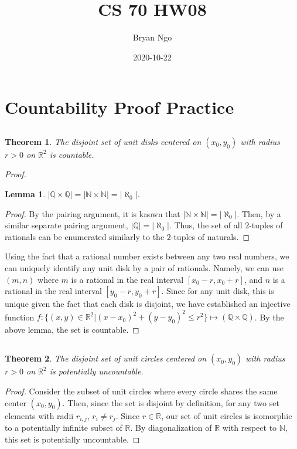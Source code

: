 \documentclass{article}
\title{CS 70 HW08}
\author{Bryan Ngo}
\date{2020-10-22}
\newtheorem{theorem}{Theorem}
\newtheorem{lemma}{Lemma}
\newcommand{\N}{\mathbb{N}}
\newcommand{\Q}{\mathbb{Q}}
\newcommand{\R}{\mathbb{R}}
\begin{document}
\maketitle

\section{Countability Proof Practice}

\subsection{}

\begin{theorem}
    The disjoint set of unit disks centered on \((x_0, y_0)\) with radius \(r > 0\) on \(\R^2\) is countable.
\end{theorem}
\begin{proof}
    \begin{lemma}
        \(|\Q \times \Q| = |\N \times \N| = |\aleph_0|\).
    \end{lemma}
    \begin{proof}
        By the pairing argument, it is known that \(|\N \times \N| = |\aleph_0|\).
        Then, by a similar separate pairing argument, \(|\Q| = |\aleph_0|\).
        Thus, the set of all \(2\)-tuples of rationals can be enumerated similarly to the \(2\)-tuples of naturals.
    \end{proof}
    Using the fact that a rational number exists between any two real numbers, we can uniquely identify any unit disk by a pair of rationals.
    Namely, we can use \((m, n)\) where \(m\) is a rational in the real interval \([x_0 - r, x_0 + r]\), and \(n\) is a rational in the real interval \([y_0 - r, y_0 + r]\).
    Since for any unit disk, this is unique given the fact that each disk is disjoint, we have established an injective function \(f: \{(x, y) \in \R^2 | (x - x_0)^2 + (y - y_0)^2 \leqslant r^2\} \mapsto (\Q \times \Q)\).
    By the above lemma, the set is countable.
\end{proof}

\subsection{}

\begin{theorem}
    The disjoint set of unit circles centered on \((x_0, y_0)\) with radius \(r > 0\) on \(\R^2\) is potentially uncountable.
\end{theorem}
\begin{proof}
    Consider the subset of unit circles where every circle shares the same center \((x_0, y_0)\).
    Then, since the set is disjoint by definition, for any two set elements with radii \(r_{i, j}\), \(r_i \neq r_j\).
    Since \(r \in \R\), our set of unit circles is isomorphic to a potentially infinite subset of \(\R\).
    By diagonalization of \(\R\) with respect to \(\N\), this set is potentially uncountable.
\end{proof}
\end{document}
